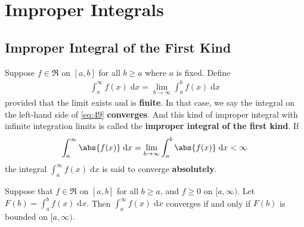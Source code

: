 \documentclass[thmcnt=section, 12pt]{elegantbook}
\begin{document}

\begin{theorem}
    
\end{theorem}



\chapter{Improper Integrals}


\section{Improper Integral of the First Kind}


\begin{definition}
    Suppose $f \in \mathfrak{R}$ on $[a,b]$ for all $b \geq a$ where $a$ is fixed. Define 
    \begin{align}
        \int_a^\infty f(x) \; \mathrm{d}x
        = \lim_{b \to \infty} \int_a^b f(x) \; \mathrm{d}x
        \label{eq:49}
    \end{align}
    provided that the limit exists and is \textbf{finite}. In that case, we say the integral on the left-hand side of \eqref{eq:49} \textbf{converges}. And this kind of improper integral with infinite integration limits is called the \textbf{improper integral of the first kind}. If 
    \begin{align*}
        \int_a^\infty \abs{f(x)} \; \mathrm{d}x
        = \lim_{b \to \infty} \int_a^b \abs{f(x)} \; \mathrm{d}x
        < \infty
    \end{align*}
    the integral $\int_a^\infty f(x) \; \mathrm{d}x$ is said to converge \textbf{absolutely}.
\end{definition}


\begin{theorem}
    Suppose that $f \in \mathfrak{R}$ on $[a,b]$ for all $b \geq a$, and $f \geq 0$ on $[a, \infty)$. Let $F(b) = \int_a^b f(x) \; \mathrm{d}x$. Then $\int_a^\infty f(x) \; \mathrm{d}x$ converges if and only if $F(b)$ is bounded on $[a, \infty)$.
\end{theorem}
\end{document}
